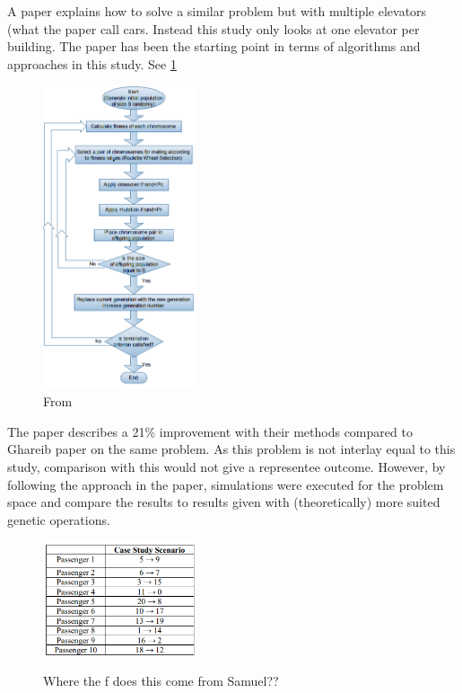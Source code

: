 
A paper\cite{tartan2016genetic} explains how to solve a similar problem but with multiple elevators (what the paper call cars. Instead this study only looks at one elevator per building. The paper has been the starting point in terms of algorithms and approaches in this study. See \ref{fig:Flow_1}

\begin{figure}[ht]
\centering
\includegraphics[width=0.4\textwidth]{diagram_1.png}
\caption{From \cite{tartan2016flow}}
	\label{fig:Flow_1}
\end{figure}
The paper describes a 21\% improvement with their methods compared to Ghareib paper \cite{gharieb2005optimal} on the same problem. As this problem is not interlay equal to this study, comparison with this would not give a representee outcome. However, by following the approach in the paper, simulations were executed for the problem space and compare the results to results given with (theoretically) more suited genetic operations.
\newpage

\begin{figure}[ht]
\centering
\includegraphics[width=0.4\textwidth]{tabel_1.png}
	\label{fig:Tabel_1}
\caption{Where the f does this come from Samuel??}
\end{figure}

